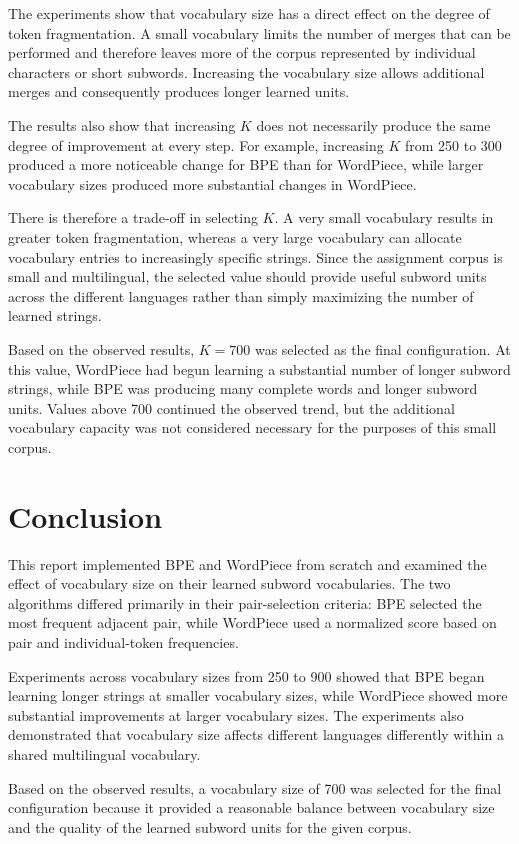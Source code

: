 \documentclass[sigconf]{acmart}
\begin{document}
The experiments show that vocabulary size has a direct effect on the
degree of token fragmentation. A small vocabulary limits the number of
merges that can be performed and therefore leaves more of the corpus
represented by individual characters or short subwords. Increasing the
vocabulary size allows additional merges and consequently produces
longer learned units.

The results also show that increasing \(K\) does not necessarily
produce the same degree of improvement at every step. For example,
increasing \(K\) from 250 to 300 produced a more noticeable change for
BPE than for WordPiece, while larger vocabulary sizes produced more
substantial changes in WordPiece.

There is therefore a trade-off in selecting \(K\). A very small
vocabulary results in greater token fragmentation, whereas a very large
vocabulary can allocate vocabulary entries to increasingly specific
strings. Since the assignment corpus is small and multilingual, the
selected value should provide useful subword units across the different
languages rather than simply maximizing the number of learned strings.

Based on the observed results, \(K=700\) was selected as the final
configuration. At this value, WordPiece had begun learning a
substantial number of longer subword strings, while BPE was producing
many complete words and longer subword units. Values above 700
continued the observed trend, but the additional vocabulary capacity
was not considered necessary for the purposes of this small corpus.

\section{Conclusion}

This report implemented BPE and WordPiece from scratch and examined the
effect of vocabulary size on their learned subword vocabularies. The
two algorithms differed primarily in their pair-selection criteria:
BPE selected the most frequent adjacent pair, while WordPiece used a
normalized score based on pair and individual-token frequencies.

Experiments across vocabulary sizes from 250 to 900 showed that BPE
began learning longer strings at smaller vocabulary sizes, while
WordPiece showed more substantial improvements at larger vocabulary
sizes. The experiments also demonstrated that vocabulary size affects
different languages differently within a shared multilingual
vocabulary.

Based on the observed results, a vocabulary size of 700 was selected
for the final configuration because it provided a reasonable balance
between vocabulary size and the quality of the learned subword units
for the given corpus.
\end{document}

